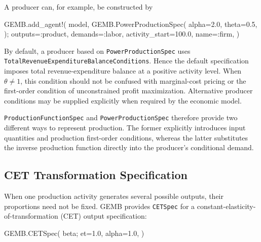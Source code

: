 \documentclass[
  letterpaper,
  DIV=11,
  numbers=noendperiod]{scrreprt}
\newenvironment{Shaded}{\begin{snugshade}}{\end{snugshade}}
\newcommand{\FloatTok}[1]{\textcolor[rgb]{0.68,0.00,0.00}{#1}}
\newcommand{\FunctionTok}[1]{\textcolor[rgb]{0.28,0.35,0.67}{#1}}
\newcommand{\NormalTok}[1]{\textcolor[rgb]{0.00,0.23,0.31}{#1}}
\newcommand{\OperatorTok}[1]{\textcolor[rgb]{0.37,0.37,0.37}{#1}}
\begin{document}
A producer can, for example, be constructed by

\begin{Shaded}
\begin{Highlighting}[]
\NormalTok{GEMB.}\FunctionTok{add\_agent!}\NormalTok{(}
\NormalTok{    model,}
\NormalTok{    GEMB.}\FunctionTok{PowerProductionSpec}\NormalTok{(}
\NormalTok{        alpha}\OperatorTok{=}\FloatTok{2.0}\NormalTok{,}
\NormalTok{        theta}\OperatorTok{=}\FloatTok{0.5}\NormalTok{,}
\NormalTok{    );}
\NormalTok{    outputs}\OperatorTok{=:}\NormalTok{product,}
\NormalTok{    demands}\OperatorTok{=:}\NormalTok{labor,}
\NormalTok{    activity\_start}\OperatorTok{=}\FloatTok{100.0}\NormalTok{,}
\NormalTok{    name}\OperatorTok{=:}\NormalTok{firm,}
\NormalTok{)}
\end{Highlighting}
\end{Shaded}

By default, a producer based on \texttt{PowerProductionSpec} uses
\texttt{TotalRevenueExpenditureBalanceConditions}. Hence the default
specification imposes total revenue-expenditure balance at a positive
activity level. When \(\theta\ne1\), this condition should not be
confused with marginal-cost pricing or the first-order condition of
unconstrained profit maximization. Alternative producer conditions may
be supplied explicitly when required by the economic model.

\texttt{ProductionFunctionSpec} and \texttt{PowerProductionSpec}
therefore provide two different ways to represent production. The former
explicitly introduces input quantities and production first-order
conditions, whereas the latter substitutes the inverse production
function directly into the producer's conditional demand.

\subsection{CET Transformation
Specification}\label{cet-transformation-specification}

When one production activity generates several possible outputs, their
proportions need not be fixed. GEMB provides \texttt{CETSpec} for a
constant-elasticity-of-transformation (CET) output specification:

\begin{Shaded}
\begin{Highlighting}[]
\NormalTok{GEMB.}\FunctionTok{CETSpec}\NormalTok{(}
\NormalTok{    beta;}
\NormalTok{    et}\OperatorTok{=}\FloatTok{1.0}\NormalTok{,}
\NormalTok{    alpha}\OperatorTok{=}\FloatTok{1.0}\NormalTok{,}
\NormalTok{)}
\end{Highlighting}
\end{Shaded}
\end{document}
